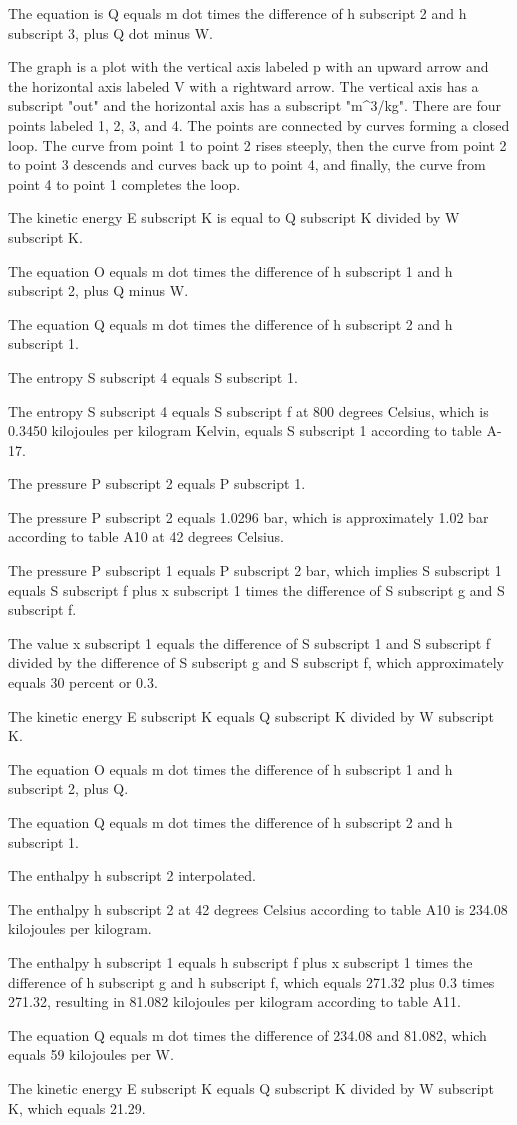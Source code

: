 The equation is Q equals m dot times the difference of h subscript 2 and h subscript 3, plus Q dot minus W.

The graph is a plot with the vertical axis labeled p with an upward arrow and the horizontal axis labeled V with a rightward arrow. The vertical axis has a subscript "out" and the horizontal axis has a subscript "m^3/kg". There are four points labeled 1, 2, 3, and 4. The points are connected by curves forming a closed loop. The curve from point 1 to point 2 rises steeply, then the curve from point 2 to point 3 descends and curves back up to point 4, and finally, the curve from point 4 to point 1 completes the loop.

The kinetic energy E subscript K is equal to Q subscript K divided by W subscript K.

The equation O equals m dot times the difference of h subscript 1 and h subscript 2, plus Q minus W.

The equation Q equals m dot times the difference of h subscript 2 and h subscript 1.

The entropy S subscript 4 equals S subscript 1.

The entropy S subscript 4 equals S subscript f at 800 degrees Celsius, which is 0.3450 kilojoules per kilogram Kelvin, equals S subscript 1 according to table A-17.

The pressure P subscript 2 equals P subscript 1.

The pressure P subscript 2 equals 1.0296 bar, which is approximately 1.02 bar according to table A10 at 42 degrees Celsius.

The pressure P subscript 1 equals P subscript 2 bar, which implies S subscript 1 equals S subscript f plus x subscript 1 times the difference of S subscript g and S subscript f.

The value x subscript 1 equals the difference of S subscript 1 and S subscript f divided by the difference of S subscript g and S subscript f, which approximately equals 30 percent or 0.3.

The kinetic energy E subscript K equals Q subscript K divided by W subscript K.

The equation O equals m dot times the difference of h subscript 1 and h subscript 2, plus Q.

The equation Q equals m dot times the difference of h subscript 2 and h subscript 1.

The enthalpy h subscript 2 interpolated.

The enthalpy h subscript 2 at 42 degrees Celsius according to table A10 is 234.08 kilojoules per kilogram.

The enthalpy h subscript 1 equals h subscript f plus x subscript 1 times the difference of h subscript g and h subscript f, which equals 271.32 plus 0.3 times 271.32, resulting in 81.082 kilojoules per kilogram according to table A11.

The equation Q equals m dot times the difference of 234.08 and 81.082, which equals 59 kilojoules per W.

The kinetic energy E subscript K equals Q subscript K divided by W subscript K, which equals 21.29.
